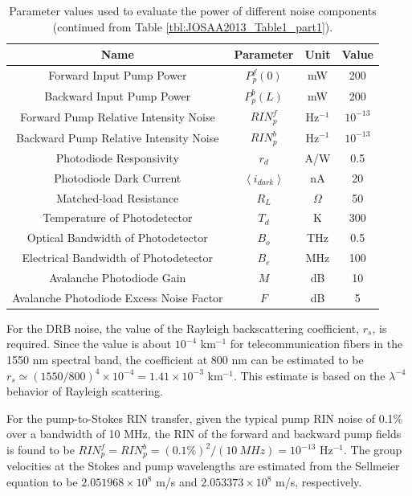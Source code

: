 \begin{table}[t]
\begin{centering}
\begin{tabular}{|c|c|c|c|} \hline
Name & Parameter & Unit & Value\\ \hline\hline
Forward Input Pump Power & $P_p^f(0)$ & mW & 200 \\ \hline
Backward Input Pump Power & $P_p^b(L)$ & mW & 200 \\ \hline
Forward Pump Relative Intensity Noise & $RIN_p^f$ & Hz$^{-1}$ & $10^{-13}$ \\ \hline
Backward Pump Relative Intensity Noise & $RIN_p^b$ & Hz$^{-1}$ & $10^{-13}$ \\ \hline
Photodiode Responsivity & $r_d$ & A/W & 0.5 \\ \hline
Photodiode Dark Current & $\left\langle i_{dark}\right\rangle$ & nA & 20 \\ \hline
Matched-load Resistance & $R_L$ & $\Omega$ & 50\\ \hline
Temperature of Photodetector & $T_d$ & K & 300 \\ \hline
Optical Bandwidth of Photodetector & $B_o$ & THz & 0.5 \\ \hline
Electrical Bandwidth of Photodetector & $B_e$ & MHz & 100 \\ \hline
Avalanche Photodiode Gain & $M$ & dB & 10 \\ \hline
Avalanche Photodiode Excess Noise Factor & $F$ & dB & 5 \\ \hline
\end{tabular}
\caption{Parameter values used to evaluate the power of different noise components (continued from Table \ref{tbl:JOSAA2013_Table1_part1}).}
\label{tbl:JOSAA2013_Table1_part2}
\end{centering}
\end{table}

For the DRB noise, the value of the Rayleigh backscattering coefficient, $r_s$, is required. Since the value is about $10^{-4}$ km$^{-1}$ for telecommunication fibers in the 1550 nm spectral band, the coefficient at 800 nm can be estimated to be  $r_s \simeq (1550/800)^4 \times 10^{-4} = 1.41 \times 10^{-3}$ km$^{-1}$. This estimate is based on the $\lambda^{-4}$ behavior of Rayleigh scattering.

For the pump-to-Stokes RIN transfer, given the typical pump RIN noise of 0.1\% over a bandwidth of 10 MHz, the RIN of the forward and backward pump fields is found to be $RIN_p^f = RIN_p^b = (0.1\%)^2/(\SI{10}{MHz}) = 10^{-13}$ Hz$^{-1}$. The group velocities at the Stokes and pump wavelengths are estimated from the Sellmeier equation to be $2.051968 \times 10^8$ m/s and $2.053373 \times 10^8$ m/s, respectively.

